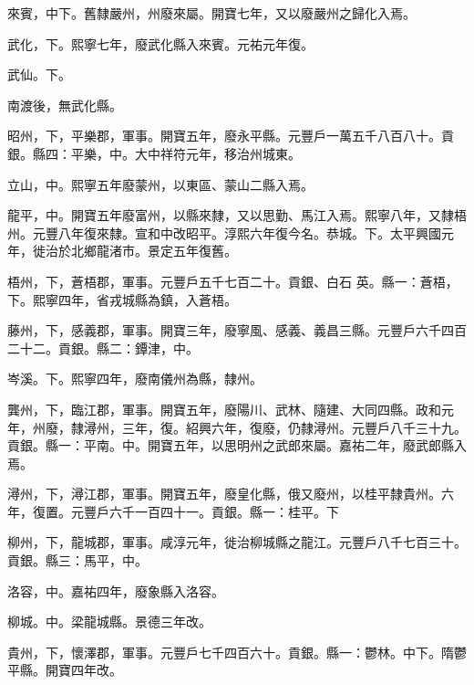\begin{pinyinscope}
 來賓，中下。舊隸嚴州，州廢來屬。開寶七年，又以廢嚴州之歸化入焉。



 武化，下。熙寧七年，廢武化縣入來賓。元祐元年復。



 武仙。下。



 南渡後，無武化縣。



 昭州，下，平樂郡，軍事。開寶五年，廢永平縣。元豐戶一萬五千八百八十。貢銀。縣四：平樂，中。大中祥符元年，移治州城東。



 立山，中。熙寧五年廢蒙州，以東區、蒙山二縣入焉。



 龍平，中。開寶五年廢富州，以縣來隸，又以思勤、馬江入焉。熙寧八年，又隸梧州。元豐八年復來隸。宣和中改昭平。淳熙六年復今名。恭城。下。太平興國元年，徙治於北鄉龍渚市。景定五年復舊。



 梧州，下，蒼梧郡，軍事。元豐戶五千七百二十。貢銀、白石
 英。縣一：蒼梧，下。熙寧四年，省戎城縣為鎮，入蒼梧。



 藤州，下，感義郡，軍事。開寶三年，廢寧風、感義、義昌三縣。元豐戶六千四百二十二。貢銀。縣二：鐔津，中。



 岑溪。下。熙寧四年，廢南儀州為縣，隸州。



 龔州，下，臨江郡，軍事。開寶五年，廢陽川、武林、隨建、大同四縣。政和元年，州廢，隸潯州，三年，復。紹興六年，復廢，仍隸潯州。元豐戶八千三十九。貢銀。縣一：平南。中。開寶五年，以思明州之武郎來屬。嘉祐二年，廢武郎縣入焉。



 潯州，下，潯江郡，軍事。開寶五年，廢皇化縣，俄又廢州，以桂平隸貴州。六年，復置。元豐戶六千一百四十一。貢銀。縣一：桂平。下



 柳州，下，龍城郡，軍事。咸淳元年，徙治柳城縣之龍江。元豐戶八千七百三十。貢銀。縣三：馬平，中。



 洛容，中。嘉祐四年，廢象縣入洛容。



 柳城。中。梁龍城縣。景德三年改。



 貴州，下，懷澤郡，軍事。元豐戶七千四百六十。貢銀。縣一：鬱林。中下。隋鬱平縣。開寶四年改。




\end{pinyinscope}
